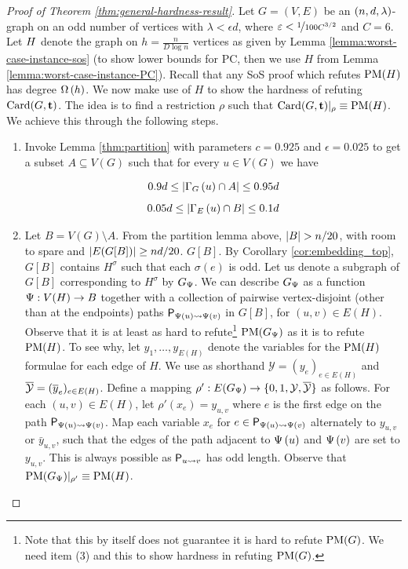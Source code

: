 \documentclass[11pt]{article}
\begin{document}
\begin{proof}[Proof of Theorem \ref{thm:general-hardness-result}]
Let $G=(V,E)$ be an $\EnDeeLambda$-graph on an odd number of vertices with $\lambda < \epsilon d$, where $\epsilon < \nicefrac{1}{100C^{3/2}}$ and $C=6$. Let $\HardInstance$ denote the graph on $h=\frac{n}{D \log n}$ vertices as given by Lemma \ref{lemma:worst-case-instance-sos} (to show lower bounds for PC, then we use $H$ from Lemma \ref{lemma:worst-case-instance-PC}). Recall that any SoS proof which refutes $\PM{H}$ has degree $\BigOmega{h}$. We now make use of $H$ to show the hardness of refuting $\Card{G, \vec{t}}$. The idea is to find a restriction $\rho$ such that $\Card{G, \vec{t}}|_\rho \equiv \PM{H}$. We achieve this through the following steps.

\begin{enumerate}
\item{Invoke Lemma  \ref{thm:partition} with parameters $c=0.925$ and $\epsilon = 0.025$ to get a subset $A \subseteq V(G)$ such that for every $u \in V(G)$ we have
    
\begin{align} 
0.9d  \leq   \Size{\Neighbourhood{G}{u} \cap \RedA} \leq 0.95d \label{eq:size_nbr_A}\\[5pt]
0.05d  \leq   \Size{\Neighbourhood{E}{u} \cap \GreenB} \leq 0.1d \label{eq:size_nbr_B}
\end{align}
}

\item{Let $B = V(G) \setminus A$. From the partition lemma above, $\Size{B} > n/20$, with room to spare and $\Size{E(G[B])} \ge nd/20$. $G[B]$.
    By Corollary \ref{cor:embedding_top}, $G[B]$ contains $H^{\sigma}$ such that each $\sigma(e)$ is odd. Let us denote a subgraph of $G[B]$ corresponding to $H^{\sigma}$ by $G_{\EmbeddingFunc}$.
    We can describe $G_\EmbeddingFunc$ as a function $\EmbeddingFunc: V(H) \to B$ together with a collection of pairwise vertex-disjoint (other than at the endpoints) paths  $\Path{\Embedding{u}}{\Embedding{v}}$ in $G[B]$, for $(u,v) \in E(H)$.
    Observe that it is at least as hard to refute\footnote{Note that this by itself does not guarantee it is hard to refute $\PM{G}$. We need item (3) and this to show hardness in refuting $\PM{G}$.} $\PM{G_{\EmbeddingFunc}}$ as it is to refute $\PM{H}$.
To see why, let $y_1, \dots, y_{E(H)}$ denote the variables for the $\PM{H}$ formulae for each edge of $H$.
We use as shorthand $\mathcal{Y} = (y_e)_{e \in E(H)}$ and $\Complement{\mathcal{Y}} = (\Complement{y}_e)_{e \in E(H)}$.
Define a mapping $\rho': \Edges{G_\EmbeddingFunc} \to \{0,1, \mathcal{Y}, \Complement{\mathcal{Y}} \}$ as follows. For each $(u,v) \in E(H)$, let $\rho'(x_e) = y_{u,v}$ where $e$ is the first edge on the path $\Path{\Embedding{u}}{\Embedding{v}}$.
Map each variable $x_e$ for $e \in \Path{\Embedding{u}}{\Embedding{v}}$ alternately to $y_{u,v}$ or $\bar{y}_{u,v}$, such that the edges of the path adjacent to $\Embedding{u}$ and $\Embedding{v}$ are set to $y_{u,v}$. This is always possible as $\Path{u}{v}$ has odd length. Observe that $\PM{G_\EmbeddingFunc}|_{\rho'} \equiv \PM{H}$.
  }


\end{enumerate}
\end{proof}
\end{document}
